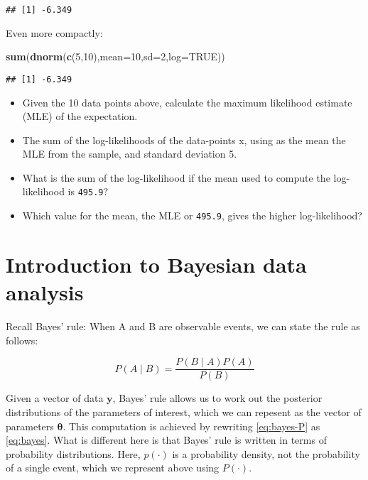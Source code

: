 \documentclass[12pt,]{krantz}
\newenvironment{Shaded}{\begin{snugshade}}{\end{snugshade}}
\newcommand{\DataTypeTok}[1]{\textcolor[rgb]{0.13,0.29,0.53}{#1}}
\newcommand{\DecValTok}[1]{\textcolor[rgb]{0.00,0.00,0.81}{#1}}
\newcommand{\KeywordTok}[1]{\textcolor[rgb]{0.13,0.29,0.53}{\textbf{#1}}}
\newcommand{\NormalTok}[1]{#1}
\newcommand{\OtherTok}[1]{\textcolor[rgb]{0.56,0.35,0.01}{#1}}
\providecommand{\tightlist}{%
  \setlength{\itemsep}{0pt}\setlength{\parskip}{0pt}}
\begin{document}
\begin{verbatim}
## [1] -6.349
\end{verbatim}

Even more compactly:

\begin{Shaded}
\begin{Highlighting}[]
\KeywordTok{sum}\NormalTok{(}\KeywordTok{dnorm}\NormalTok{(}\KeywordTok{c}\NormalTok{(}\DecValTok{5}\NormalTok{,}\DecValTok{10}\NormalTok{),}\DataTypeTok{mean=}\DecValTok{10}\NormalTok{,}\DataTypeTok{sd=}\DecValTok{2}\NormalTok{,}\DataTypeTok{log=}\OtherTok{TRUE}\NormalTok{))}
\end{Highlighting}
\end{Shaded}

\begin{verbatim}
## [1] -6.349
\end{verbatim}

\begin{itemize}
\tightlist
\item
  Given the 10 data points above, calculate the maximum likelihood estimate (MLE) of the expectation.
\item
  The sum of the log-likelihoods of the data-points x, using as the mean the MLE from the sample, and standard deviation 5.
\item
  What is the sum of the log-likelihood if the mean used to compute the log-likelihood is \texttt{495.9}?
\item
  Which value for the mean, the MLE or \texttt{495.9}, gives the higher log-likelihood?
\end{itemize}

\hypertarget{introBDA}{%
\chapter{Introduction to Bayesian data analysis}\label{introBDA}}

Recall Bayes' rule: When A and B are observable events,
we can state the rule as follows:

\begin{equation}
P(A\mid B) = \frac{P(B\mid A) P(A)}{P(B)}
\label{eq:bayes-P}
\end{equation}

Given a vector of data \(\boldsymbol{y}\), Bayes' rule allows us to work out the posterior distributions of the parameters of interest, which we can repesent as the vector of parameters \(\boldsymbol{\theta}\). This computation is achieved by rewriting \eqref{eq:bayes-P} as \eqref{eq:bayes}. What is different here is that Bayes' rule is written in terms of probability distributions. Here, \(p(\cdot)\) is a probability density, not the probability of a single event, which we represent above using \(P(\cdot)\).
\end{document}
